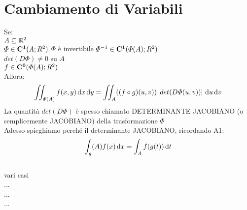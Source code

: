 \section{Cambiamento di Variabili}
Se:\\
$A\subseteq \mathbb{R}^2$\\
$\varPhi\in \mathbf{C^{1}}(A;R^2)$
$\varPhi$ è invertibile
$\varPhi^{-1}\in \mathbf{C^{1}}(\varPhi(A);R^2)$\\
$det(D\varPhi)\ne 0$ su $A$\\
$f\in \mathbf{C^{0}}(\varPhi(A);R^2)$\\
Allora:\\
$$ \iint_{\varPhi(A)}f(x,y)\,\mathrm{d}{x}\,\mathrm{d}{y}=\iint_A((f\circ g)(u,v))\left|det(D\varPhi(u,v))\right|\,\mathrm{d}{u}\,\mathrm{d}{v}$$
La quantità $det(D\varPhi)$ è spesso chiamato DETERMINANTE JACOBIANO (o semplicemente JACOBIANO) della trasformazione $\varPhi$\\
Adesso spieghiamo perché il determinante JACOBIANO, ricordando A1:
$$ \int_g(A)f(x)\,\mathrm{d}{x} = \int_Af(g(t))\,\mathrm{d}{t}$$\\
vari casi\\
...\\
...\\
...\\



